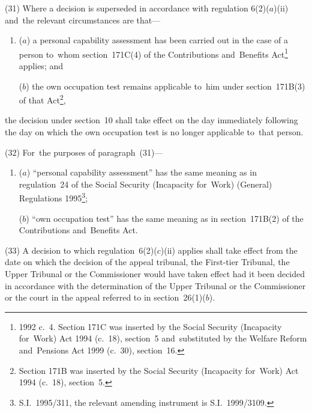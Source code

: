 \documentclass[12pt,a4paper]{article}
\begin{document}
\begin{sloppypar}
(31) Where a decision is superseded in accordance with regulation 6(2)($a$)(ii)  and~the relevant circumstances are that—
\end{sloppypar}
\begin{enumerate}\item[]
($a$) a personal capability assessment has been carried out in the case of a person to~whom section~171C(4) of the Contributions and~Benefits Act\footnote{1992 c.\ 4. Section 171C was inserted by the Social Security (Incapacity for~Work) Act 1994 (c.\ 18), section~5 and~substituted by the Welfare Reform and~Pensions Act 1999 (c.\ 30), section~16.} applies; and

($b$) the own occupation test remains applicable to~him under section~171B(3) of that Act\footnote{Section 171B was inserted by the Social Security (Incapacity for~Work) Act 1994 (c.\ 18), section~5.},
\end{enumerate}
the decision under section~10 shall take effect on the day immediately following the day on which the own occupation test is no longer applicable to~that person.

(32) For~the purposes of paragraph~(31)—
\begin{enumerate}\item[]
($a$) “personal capability assessment” has the same meaning as in regulation~24 of the Social Security (Incapacity for~Work) (General) Regulations 1995\footnote{S.I.~1995/311, the relevant amending instrument is S.I.~1999/3109.};

($b$) “own occupation test” has the same meaning as in section~171B(2) of the Contributions and~Benefits Act.
\end{enumerate}

(33) A decision to which regulation~6(2)($c$)(ii)  applies shall take effect from the date on which 
the decision of the appeal tribunal, the First-tier Tribunal, the Upper Tribunal or the Commissioner  %
would have taken effect had it been decided in accordance with the determination of the 
Upper Tribunal  %
or the Commissioner  %
or the court in the appeal referred to in section~26(1)($b$).
\end{document}
